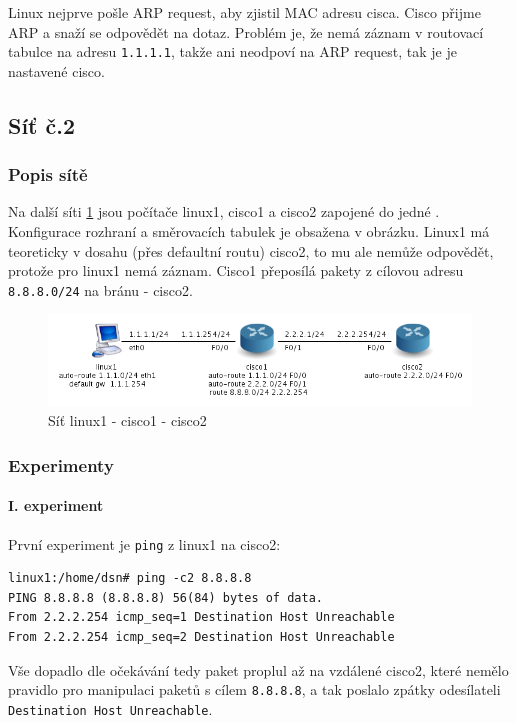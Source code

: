 Linux nejprve pošle ARP request, aby zjistil MAC adresu cisca. Cisco přijme ARP a snaží se odpovědět na dotaz. Problém je, že nemá záznam v routovací tabulce na adresu \verb|1.1.1.1|, takže ani neodpoví na ARP request, tak je  je nastavené cisco.


\subsection{Síť č.2}
\subsubsection{Popis sítě}
Na další síti \ref{fig:sit_3pc} jsou počítače linux1, cisco1 a cisco2 zapojené do jedné . Konfigurace rozhraní a směrovacích tabulek je obsažena v obrázku. Linux1 má teoreticky v dosahu (přes defaultní routu) cisco2, to mu ale nemůže odpovědět, protože pro linux1 nemá záznam. Cisco1 přeposílá pakety z cílovou adresu \verb|8.8.8.0/24| na bránu - cisco2.

\begin{figure}[h]
\begin{center}
\includegraphics[width=15cm]{figures/sit_3pc.png}
\caption{Síť linux1 - cisco1 - cisco2}
\label{fig:sit_3pc}
\end{center}
\end{figure}


\newpage

\subsubsection{Experimenty} 

\paragraph{I. experiment}
První experiment je \verb|ping| z linux1 na cisco2:
\begin{verbatim}
linux1:/home/dsn# ping -c2 8.8.8.8
PING 8.8.8.8 (8.8.8.8) 56(84) bytes of data.
From 2.2.2.254 icmp_seq=1 Destination Host Unreachable
From 2.2.2.254 icmp_seq=2 Destination Host Unreachable
\end{verbatim}
Vše dopadlo dle očekávání tedy paket proplul až na vzdálené cisco2, které nemělo pravidlo pro manipulaci paketů s cílem \verb|8.8.8.8|, a tak poslalo zpátky odesílateli \\ \verb|Destination Host Unreachable|.
\newline

